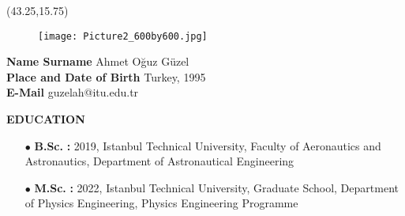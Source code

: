\vspace*{10mm}
\setlength{\TPHorizModule}{10pt}
\setlength{\TPVertModule}{10pt}
\begin{textblock}{1}(43.25,15.75) %
	\begin{figure}[p]
		\texttt{[image: Picture2\_600by600.jpg]}
	\end{figure}	
\end{textblock}
\vspace*{30mm}
\textbf{Name Surname\makebox[2.155cm]{\hfill \textbf{:}}}\hspace{0.225em} Ahmet Oğuz Güzel\\ %

\vspace{-3mm}
\textbf{Place and Date of Birth\makebox[0.735cm]{\hfill \textbf{:}}}\hspace{0.225em} Turkey, 1995\\ %

\vspace{-3mm}
\textbf{E-Mail\makebox[3.685cm]{\hfill \textbf{:}}}\hspace{0.225em} guzelah@itu.edu.tr\\ %

\vspace{5mm}

\renewcommand\labelitemi{\normalsize$\bullet$} 			%

\textbf{EDUCATION\makebox[2.41cm]{\hfill \textbf{:}}}  	%
\vspace{-3mm}

\begin{itemize}[leftmargin=5.15cm,itemsep=-0.25em,labelsep=2mm] %
	\item [$\bullet$ \hspace{1em}\textbf{B.Sc.} \hspace{6.85em} \textbf{:}] 2019, Istanbul Technical University, Faculty of Aeronautics and Astronautics, Department of Astronautical Engineering
	\item [$\bullet$ \hspace{1em}\textbf{M.Sc.} \hspace{6.55em} \textbf{:}] 2022, Istanbul Technical University, Graduate School, Department of Physics Engineering, Physics Engineering Programme
\end{itemize}

